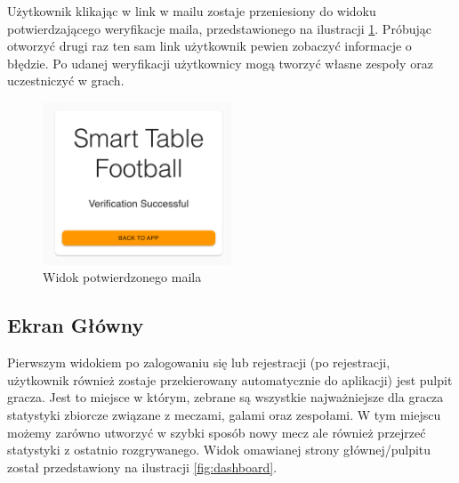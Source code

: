 Użytkownik klikając w link w mailu zostaje przeniesiony do widoku potwierdzającego weryfikacje maila, przedstawionego na ilustracji \ref{fig:verfied-email-confirmation}. Próbując otworzyć drugi raz ten sam link użytkownik pewien zobaczyć informacje o błędzie. Po udanej weryfikacji użytkownicy mogą tworzyć własne zespoły oraz uczestniczyć w grach.

\begin{figure}[h!]
  \centering
    \includegraphics[width=0.5\textwidth]{images/player/verfied_emial_confirmation.png}
  \caption{Widok potwierdzonego maila}
  \label{fig:verfied-email-confirmation}
\end{figure}

\subsection{Ekran Główny}

Pierwszym widokiem po zalogowaniu się lub rejestracji (po rejestracji, użytkownik również zostaje przekierowany automatycznie do aplikacji) jest pulpit gracza. Jest to miejsce w którym, zebrane są wszystkie najważniejsze dla gracza statystyki zbiorcze związane z meczami, galami oraz zespołami. W tym miejscu możemy zarówno utworzyć w szybki sposób nowy mecz ale również przejrzeć statystyki z ostatnio rozgrywanego. Widok omawianej strony głównej/pulpitu został przedstawiony na ilustracji \ref{fig:dashboard}.

